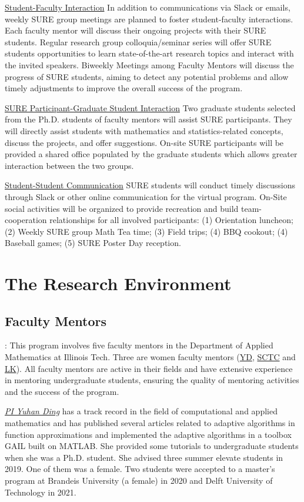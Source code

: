 \documentclass[11pt]{NSFamsart}
\newcommand{\SCTC}{\hyperlink{SCTClink}{SCTC}\xspace}
\newcommand{\YD}{\hyperlink{YDlink}{YD}\xspace}
\newcommand{\LK}{\hyperlink{LKlink}{LK}\xspace}
\begin{document}
\noindent  
\underline{Student-Faculty Interaction}
In addition to communications via Slack or emails, weekly SURE group meetings are planned to foster student-faculty interactions.  Each
faculty mentor will discuss their ongoing projects with their SURE students. Regular research group colloquia/seminar series
will offer SURE students opportunities to learn state-of-the-art research topics and interact
with the invited speakers.
Biweekly Meetings among Faculty Mentors
will discuss the progress of SURE students, aiming to detect any potential problems and allow
timely adjustments to improve the overall success of the program.

\noindent \underline{SURE Participant-Graduate Student Interaction}
Two graduate students selected from the Ph.D. students
of faculty mentors will assist SURE participants. They will
directly assist students with mathematics and statistics-related
concepts, discuss the projects, and offer suggestions. On-site SURE participants will be provided
a shared office populated by the graduate students which
allows greater interaction between the two groups. 

\noindent \underline{
Student-Student Communication}
SURE students will conduct timely discussions through Slack or
other online communication for the virtual program.
On-Site social activities will be organized to provide recreation
and build team-cooperation relationships for all involved participants: (1) Orientation luncheon; (2) Weekly SURE group Math Tea time; (3) Field trips; (4) BBQ
cookout; (4) Baseball games;  (5) SURE Poster Day reception.


\section{The Research Environment}

\subsection{Faculty Mentors}:
This program involves five faculty
mentors in the Department of Applied Mathematics at
Illinois Tech. Three are women faculty mentors (\YD, \SCTC and \LK). All faculty mentors are
active in their fields and have extensive experience in mentoring undergraduate students, ensuring the quality of mentoring activities and the success of the program.

\noindent \underline{\textit{PI Yuhan Ding}}  has a track record in the field of computational and applied
mathematics and has published several articles related to adaptive algorithms in function approximations and implemented the adaptive algorithms in a toolbox GAIL\cite{
ChoEtal20a} built on MATLAB. She provided some tutorials to undergraduate students when she was a Ph.D. student. She advised three summer elevate students in 2019. One of them was a female. Two students were accepted to a master's program at Brandeis University (a female) in 2020 and Delft University of Technology in 2021.
\end{document}
